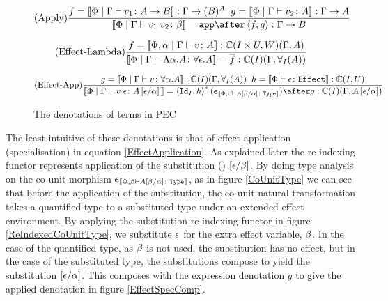 \documentclass{Report}
\begin{document}
\begin{figure}
\begin{framed}
        \[
            \treerule{Apply}{f = \deno{\gpetyperelation{v_1}{\ab}}: \G \rightarrow (B)^{A} \s\s g=\deno{\gpetyperelation{v_2}{A}}: \G \rightarrow A}{\deno{\gpetyperelation{\apply{v_1}{v_2}}{\b}}= \app\after\pr{f}{g}: \G \rightarrow B }
        \]
        
        \[
            (\text{Effect-Lambda}) \frac{f = {\bf [\![}\Phi,\alpha\mid\Gamma \vdash v \colon A{\bf ]\!]}: \mathbb{C}(I\times U, W)(\Gamma, A)}{{\bf [\![}\Phi\mid\Gamma \vdash \Lambda \alpha. A \colon \forall \epsilon. A{\bf ]\!]} = \overline{f}: \mathbb{C}(I)(\Gamma, \forall_I(A))}    
        \] 
        
        \begin{equation}\label{EffectApplication}
            \treerule{Effect-App}{g=\deno{\gpetyperelation{v}{\all{\a}{A}}}: \C(I)(\G, \allI(A))\s\s h = \deno{\typerelation{\P}{\e}{\effect}}: \ciu}{\deno{\gpetyperelation{\eapp{v}{\e}}{A\ssub{\a}{\e}}} = \pr{\Id{I}}{h}\star(\counit{\deno{\typerelation{\P,\b}{A\ssub{\a}{\b}}{\type}}})\after g: \C(I)(\G, A\ssub{\a}{\e})}
        \end{equation}                
    \end{framed}
    \caption{The denotations of terms in PEC}
    \label{TermDenotations}
\end{figure}

The least intuitive of these denotations is that of effect application (specialisation) in equation \ref{EffectApplication}. As explained later \needsRef{} the re-indexing functor represents application of the substitution () $\left[\epsilon / \beta\right]$. By doing type analysis on the co-unit morphism $ \boldsymbol{\epsilon}_{{\bf [\![}\Phi,\beta \vdash A\left[\beta / \alpha\right] \colon \texttt{Type}{\bf ]\!]}}$, as in figure \ref{CoUnitType}  we can see that before the application of the substitution, the co-unit natural transformation takes a quantified type to a substituted type under an extended effect environment. By applying the substitution re-indexing functor in figure \ref{ReIndexedCoUnitType}, we substitute $\epsilon$ for the extra effect variable, $\beta$. In the case of the quantified type, as $\beta$ is not used, the substitution has no effect, but in the case of the substituted type, the substitutions compose to yield the substitution $\left[\epsilon / \alpha\right]$. This composes with the expression denotation $g$ to give the applied denotation in figure \ref{EffectSpecComp}.
\end{document}
